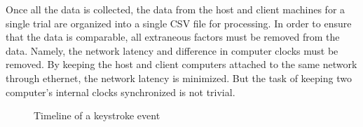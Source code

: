 \noindent
Once all the data is collected, the data from the host and client machines for a single trial are organized into a single CSV file for processing.
In order to ensure that the data is comparable, all extraneous factors must be removed from the data.
Namely, the network latency and difference in computer clocks must be removed.
By keeping the host and client computers attached to the same network through ethernet, the network latency is minimized.
But the task of keeping two computer's internal clocks synchronized is not trivial.

\begin{figure}[h]
  \startchronology[startyear=0,stopyear=10, height=0pt, dates=false, arrow=false, box=true]



  \stopchronology
  \caption[Timeline of a keystroke event]{Timeline of a keystroke event}
  \label{fig:KeystrokeTimeline}
\end{figure}

